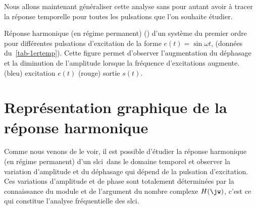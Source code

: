 Nous allons maintenant généraliser cette analyse sans pour autant avoir à 
tracer la réponse temporelle pour toutes les pulsations que l'on souhaite 
étudier.
\begin{marginfigure}[-20em]
    \centering
    \resizebox{\linewidth}{!}{}
    \resizebox{\linewidth}{!}{}
    \resizebox{\linewidth}{!}{}
    \caption{Réponse harmonique (en régime permanent) () d'un 
             système du premier ordre pour différentes pulsations d'excitation 
             de la forme $e(t)=\sin{\omega t}$, (données du~\cref{tab-1ertemp}).
             Cette figure permet d'observer l'augmentation du déphasage et la 
             diminution de l'amplitude lorsque la fréquence d'excitations 
             augmente. (bleu) excitation $e(t)$ (rouge) sortie $s(t)$.
             \label{fig-repham}}
\end{marginfigure}
\clearpage
\section*{Représentation graphique de 
la réponse harmonique}
Comme nous venons de le voir, il est possible d'étudier
la réponse harmonique (en régime permanent) d'un \gls{slci}~dans le domaine 
temporel et observer la variation d'amplitude et du 
déphasage qui dépend de la pulsation d'excitation. Ces variations 
d'amplitude et de phase sont totalement déterminées par la 
connaissance du module et de l'argument du nombre complexe $H(\jw)$, 
c'est ce qui constitue l'analyse fréquentielle des \gls{slci}.

